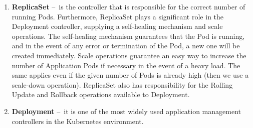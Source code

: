\begin{enumerate}
    \item \textbf{ReplicaSet} \---\ is the controller that is responsible for the correct number of running Pods.
    Furthermore, ReplicaSet plays a significant role in the Deployment controller, supplying a self-healing mechanism and scale operations.
    The self-healing mechanism guarantees that the Pod is running, and in the event of any error or termination of the Pod, a new one will be created immediately.
    Scale operations guarantee an easy way to increase the number of Application Pods if necessary in the event of a heavy load.
    The same applies even if the given number of Pods is already high (then we use a scale-down operation).
    ReplicaSet also has responsibility for the Rolling Update and Rollback operations available to Deployment.

    \item \textbf{Deployment} \---\ it is one of the most widely used application management controllers in the Kubernetes environment.


\end{enumerate}
